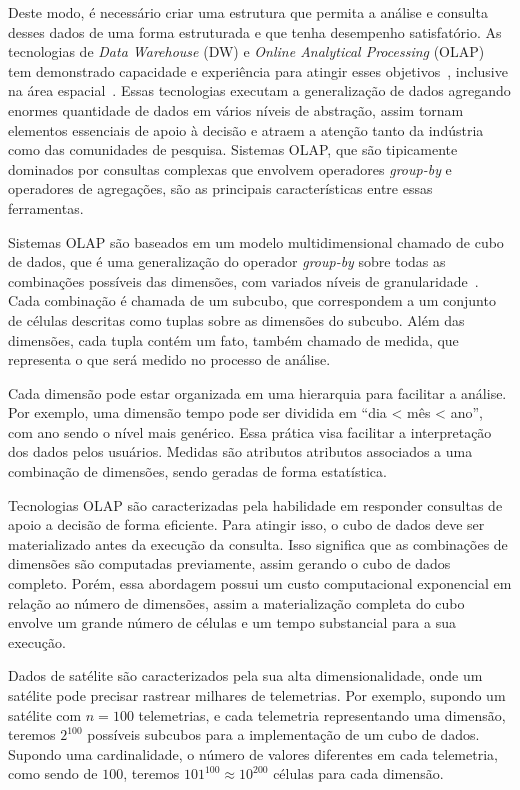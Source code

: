 Deste modo, é necessário criar uma estrutura que permita a análise e consulta desses dados de uma forma estruturada e que tenha desempenho satisfatório.
As tecnologias de \textit{Data Warehouse} (DW) e \textit{Online Analytical Processing} (OLAP) tem demonstrado capacidade e experiência para atingir esses objetivos~\cite{bimonteOpenIssuesBig2016}, inclusive na área espacial~\cite{yvernesCopernicusGroundSegment2018}.
Essas tecnologias executam a generalização de dados agregando enormes quantidade de dados em vários níveis de abstração, assim tornam elementos essenciais de apoio à decisão e atraem a atenção tanto da indústria como das comunidades de pesquisa.
Sistemas OLAP, que são tipicamente dominados por consultas complexas que envolvem operadores \textit{group-by} e operadores de agregações, são as principais características entre essas ferramentas.

Sistemas OLAP são baseados em um modelo multidimensional chamado de cubo de dados, que é uma generalização do operador \textit{group-by} sobre todas as combinações possíveis das dimensões, com variados níveis de granularidade~\cite{grayDataCubeRelational1996}.
Cada combinação é chamada de um subcubo, que correspondem a um conjunto de células descritas como tuplas sobre as dimensões do subcubo.
Além das dimensões, cada tupla contém um fato, também chamado de medida, que representa o que será medido no processo de análise.

Cada dimensão pode estar organizada em uma hierarquia para facilitar a análise.
Por exemplo, uma dimensão tempo pode ser dividida em ``dia < mês < ano'', com ano sendo o nível mais genérico.
Essa prática visa facilitar a interpretação dos dados pelos usuários.
Medidas são atributos atributos associados a uma combinação de dimensões, sendo geradas de forma estatística.

Tecnologias OLAP são caracterizadas pela habilidade em responder consultas de apoio a decisão de forma eficiente.
Para atingir isso, o cubo de dados deve ser materializado antes da execução da consulta.
Isso significa que as combinações de dimensões são computadas previamente, assim gerando o cubo de dados completo.
Porém, essa abordagem possui um custo computacional exponencial em relação ao número de dimensões, assim a materialização completa do cubo envolve um grande número de células e um tempo substancial para a sua execução.

Dados de satélite são caracterizados pela sua alta dimensionalidade, onde um satélite pode precisar rastrear milhares de telemetrias.
Por exemplo, supondo um satélite com $n = 100$ telemetrias, e cada telemetria representando uma dimensão, teremos $2^{100}$ possíveis subcubos para a implementação de um cubo de dados.
Supondo uma cardinalidade, o número de valores diferentes em cada telemetria, como sendo de $100$, teremos $101^{100} \approx 10^{200}$ células para cada dimensão.

